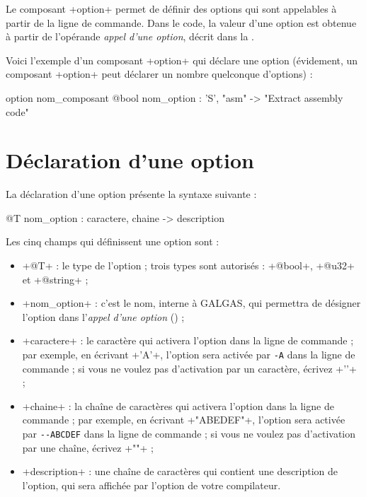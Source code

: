 




Le composant \ggsq+option+ permet de définir des options qui sont appelables à partir de la ligne de commande. Dans le code, la valeur d'une option est obtenue à partir de l'opérande \emph{appel d'une option}, décrit dans la .

Voici l'exemple d'un composant \ggsq+option+ qui déclare une option (évidement, un composant \ggsq+option+ peut déclarer un nombre quelconque d'options) :
\begin{galgas4}
option nom_composant {
  @bool nom_option : 'S', "asm" -> "Extract assembly code"
}
\end{galgas4}


\section{Déclaration d'une option}

La déclaration d'une option présente la syntaxe suivante :
\begin{galgas4}
  @T nom_option : caractere, chaine -> description
\end{galgas4}

Les cinq champs qui définissent une option sont :
\begin{itemize}
  \item \ggsq+@T+ : le type de l'option ; trois types sont autorisés : \ggsq+@bool+, \ggsq+@u32+ et \ggsq+@string+ ;
  \item \ggsq+nom_option+ : c'est le nom, interne à GALGAS, qui permettra de désigner l'option dans l'\emph{appel d'une option} () ;
  \item \ggsq+caractere+ : le caractère qui activera l'option dans la ligne de commande ; par exemple, en écrivant \ggsq+'A'+, l'option sera activée par \texttt{-A} dans la ligne de commande ; si vous ne voulez pas d'activation par un caractère, écrivez \ggsq+'\0'+ ;
  \item \ggsq+chaine+ : la chaîne de caractères qui activera l'option dans la ligne de commande ; par exemple, en écrivant \ggsq+"ABEDEF"+, l'option sera activée par \texttt{-{}-ABCDEF} dans la ligne de commande ; si vous ne voulez pas d'activation par une chaîne, écrivez \ggsq+""+ ;
  \item \ggsq+description+ : une chaîne de caractères qui contient une description de l'option, qui sera affichée par l'option  de votre compilateur.
\end{itemize}








